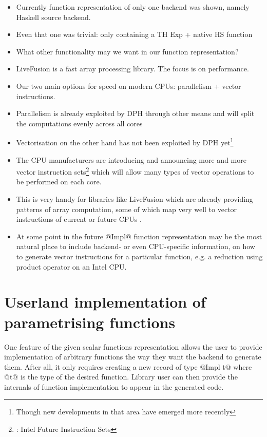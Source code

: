 \documentclass[preamble.tex]{subfiles}
\begin{document}
\begin{itemize}
\item Currently function representation of only one backend was shown, namely Haskell source backend.
\item Even that one was trivial: only containing a TH Exp + native HS function
\item What other functionality may we want in our function representation?
\item LiveFusion is a fast array processing library. The focus is on performance.
\item Our two main options for speed on modern CPUs: parallelism + vector instructions.
\item Parallelism is already exploited by DPH through other means and will split the computations evenly across all cores
\item Vectorisation on the other hand has not been exploited by DPH yet\footnote{Though new developments in that area have emerged more recently }
\item The CPU manufacturers are introducing and announcing more and more vector instruction sets\footnote{: Intel Future Instruction Sets} which will allow many types of vector operations to be performed on each core.
\item This is very handy for libraries like LiveFusion which are already providing patterns of array computation, some of which map very well to vector instructions of current or future CPUs .
\item At some point in the future @Impl@ function representation may be the most natural place to include backend- or even CPU-specific information, on how to generate vector instructions for a particular function, e.g. a reduction using product operator on an Intel CPU.
\end{itemize}

\section{Userland implementation of parametrising functions}

One feature of the given scalar functions representation allows the user to provide implementation of arbitrary functions the way they want the backend to generate them. After all, it only requires creating a new record of type @Impl t@ where @t@ is the type of the desired function. Library user can then provide the internals of function implementation to appear in the generated code.
\end{document}
